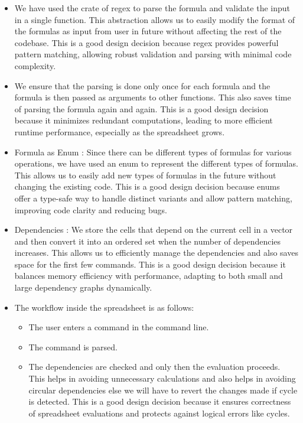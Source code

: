 \documentclass[10pt,a4paper]{article}  %
\begin{document}
\begin{enumerate}
\begin{itemize}
        \item We have used the crate of regex to parse the formula and validate the input in a single function. This abstraction allows us to easily modify the format of the formulas as input from user in future without affecting the rest of the codebase.  
        This is a good design decision because regex provides powerful pattern matching, allowing robust validation and parsing with minimal code complexity.

        \item We ensure that the parsing is done only once for each formula and the formula is then passed as arguments to other functions. This also saves time of parsing the formula again and again.  
        This is a good design decision because it minimizes redundant computations, leading to more efficient runtime performance, especially as the spreadsheet grows.

        \item Formula as Enum : Since there can be different types of formulas for various operations, we have used an enum to represent the different types of formulas. This allows us to easily add new types of formulas in the future without changing the existing code.  
        This is a good design decision because enums offer a type-safe way to handle distinct variants and allow pattern matching, improving code clarity and reducing bugs.

        \item Dependencies : We store the cells that depend on the current cell in a vector and then convert it into an ordered set when the number of dependencies increases. This allows us to efficiently manage the dependencies and also saves space for the first few commands.  
        This is a good design decision because it balances memory efficiency with performance, adapting to both small and large dependency graphs dynamically.

        \item The workflow inside the spreadsheet is as follows:
        \begin{itemize}
            \item The user enters a command in the command line.
            \item The command is parsed.
            \item The dependencies are checked and only then the evaluation proceeds. This helps in avoiding unnecessary calculations and also helps in avoiding circular dependencies else we will have to revert the changes made if cycle is detected.  
            This is a good design decision because it ensures correctness of spreadsheet evaluations and protects against logical errors like cycles.


\end{itemize}
\end{itemize}
\end{enumerate}
\end{document}
